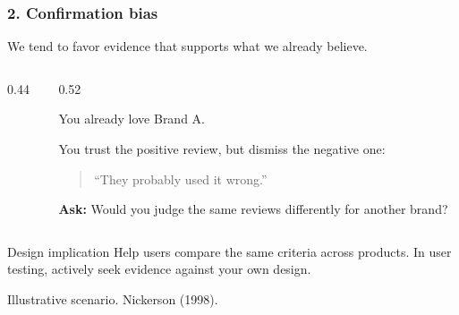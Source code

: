 \documentclass{beamer}
\begin{document}
\begin{frame}
    \frametitle{2. Confirmation bias}
    \small
    We tend to favor evidence that supports what we already believe.
    \medskip
    \begin{columns}[c]
    \begin{column}{0.44\textwidth}
    \centering
    \end{column}
    \begin{column}{0.52\textwidth}

        You already love Brand A.
        \medskip

        You trust the positive review, but dismiss the negative one:
        \begin{quote}
        ``They probably used it wrong.''
        \end{quote}
        \textbf{Ask:} Would you judge the same reviews differently for another brand?

    \end{column}
    \end{columns}
    \begin{block}{Design implication}
Help users compare the same criteria across products. In user testing, actively seek evidence against your own design.
    \end{block}
    {\tiny Illustrative scenario. Nickerson (1998).}
\end{frame}
\end{document}
